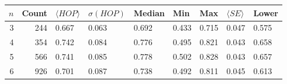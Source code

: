 \begin{tabular}{rrlllllll}
\toprule
$n$ & Count & $\langle HOP \rangle$ & $\sigma(HOP)$ & Median & Min & Max & $\langle SE \rangle$ & Lower \\
\midrule
3 & 244 & 0.667 & 0.063 & 0.692 & 0.433 & 0.715 & 0.047 & 0.575 \\
4 & 354 & 0.742 & 0.084 & 0.776 & 0.495 & 0.821 & 0.043 & 0.658 \\
5 & 566 & 0.741 & 0.085 & 0.778 & 0.502 & 0.828 & 0.043 & 0.657 \\
6 & 926 & 0.701 & 0.087 & 0.738 & 0.492 & 0.811 & 0.045 & 0.613 \\
\bottomrule
\end{tabular}
